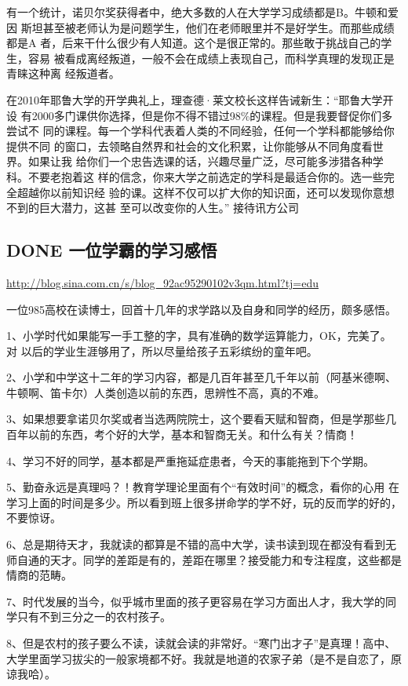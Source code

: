 \documentclass[11pt]{ctexart}
\begin{document}
{{{{有一个统计，诺贝尔奖获得者中，绝大多数的人在大学学习成绩都是B。牛顿和爱因
斯坦甚至被老师认为是问题学生，他们在老师眼里并不是好学生。而那些成绩都是A
者，后来干什么很少有人知道。这个是很正常的。那些敢于挑战自己的学生，容易
被看成离经叛道，一般不会在成绩上表现自己，而科学真理的发现正是青睐这种离
经叛道者。


在2010年耶鲁大学的开学典礼上，理查德·莱文校长这样告诫新生：“耶鲁大学开设
有2000多门课供你选择，但是你不得不错过98\%的课程。但是我要督促你们多尝试不
同的课程。每一个学科代表着人类的不同经验，任何一个学科都能够给你提供不同
的窗口，去领略自然界和社会的文化积累，让你能够从不同角度看世界。如果让我
给你们一个忠告选课的话，兴趣尽量广泛，尽可能多涉猎各种学科。不要老抱着这
样的信念，你来大学之前选定的学科是最适合你的。选一些完全超越你以前知识经
验的课。这样不仅可以扩大你的知识面，还可以发现你意想不到的巨大潜力，这甚
至可以改变你的人生。”
接待讯方公司

\subsection{{\bfseries\sffamily DONE} 一位学霸的学习感悟}
\label{sec:org94562c9}
\url{http://blog.sina.com.cn/s/blog\_92ac95290102v3qm.html?tj=edu}

一位985高校在读博士，回首十几年的求学路以及自身和同学的经历，颇多感悟。

1、小学时代如果能写一手工整的字，具有准确的数学运算能力，OK，完美了。对
以后的学业生涯够用了，所以尽量给孩子五彩缤纷的童年吧。


2、小学和中学这十二年的学习内容，都是几百年甚至几千年以前（阿基米德啊、
牛顿啊、笛卡尔）人类创造以前的东西，思辨性不高，真的不难。


3、如果想要拿诺贝尔奖或者当选两院院士，这个要看天赋和智商，但是学那些几
百年以前的东西，考个好的大学，基本和智商无关。和什么有关？情商！


4、学习不好的同学，基本都是严重拖延症患者，今天的事能拖到下个学期。

5、勤奋永远是真理吗？！教育学理论里面有个“有效时间”的概念，看你的心用
在学习上面的时间是多少。所以看到班上很多拼命学的学不好，玩的反而学的好的，
不要惊讶。


6、总是期待天才，我就读的都算是不错的高中大学，读书读到现在都没有看到无
师自通的天才。同学的差距是有的，差距在哪里？接受能力和专注程度，这些都是
情商的范畴。


7、时代发展的当今，似乎城市里面的孩子更容易在学习方面出人才，我大学的同
学只有不到三分之一的农村孩子。


8、但是农村的孩子要么不读，读就会读的非常好。“寒门出才子”是真理！高中、
大学里面学习拔尖的一般家境都不好。我就是地道的农家子弟（是不是自恋了，原
谅我哈）。


}}}}
\end{document}
